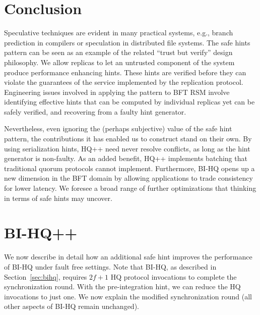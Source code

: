 \documentclass[twocolumn,10pt]{article}
\begin{document}
\section{Conclusion}
\label{sec:conclusion}
Speculative techniques are evident in many practical systems, e.g.,
branch prediction in compilers or speculation in distributed file
systems.  The safe hints pattern can be seen as an example of the
related ``trust but verify'' design philosophy. We allow replicas to let
an untrusted component of the system produce performance enhancing
hints.  These hints are verified before they can violate the
guarantees of the service implemented by the replication protocol.
Engineering issues involved in applying the pattern to BFT RSM involve
identifying effective hints that can be computed by individual
replicas yet can be safely verified, and recovering from a faulty hint
generator.

Nevertheless, even ignoring the (perhaps subjective) value of the safe
hint pattern, the contributions it has enabled us to construct stand on
their own.  By using serialization hints, HQ++ need never resolve conflicts, as long
as the hint generator is non-faulty. As an added benefit, HQ++
implements batching that traditional quorum protocols cannot
implement. Furthermore, BI-HQ opens up a new dimension in the BFT domain
by allowing applications to trade consistency for lower latency. We
foresee a broad range of further optimizations that thinking in terms of safe
hints may uncover. 



{
\footnotesize


}

\appendix
\section{BI-HQ++}

We now describe in detail how an additional safe hint improves the performance of
BI-HQ under fault free settings. Note that BI-HQ, as described in 
Section~\ref{sec:bihq}, requires $2f+1$ HQ protocol invocations to 
complete the synchronization round. With the pre-integration hint, we can reduce
the HQ invocations to just one. We now explain the modified synchronization round 
(all other aspects of BI-HQ remain unchanged).
\end{document}
